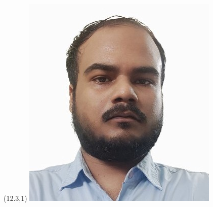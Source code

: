\documentclass[11pt,a4paper]{moderncv}
\begin{document}
\hskip-2.5cm 
\makecvtitle
\begin{textblock}{0}(12.3,1)
\includegraphics[scale=0.25]{sub1}
\end{textblock}

\end{document}
